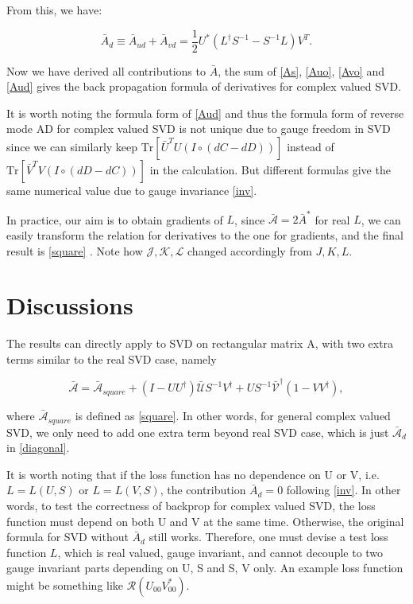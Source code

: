 \documentclass[aps,prl,singlecolumn,preprintnumbers,amsmath,amssymb,notitlepage]{revtex4-1}
\def\Tr{\mathrm{Tr}}
\newcommand{\<}{\langle}
\renewcommand{\>}{\rangle}
\newcommand{\eq}[2]{
	\begin{equation}
	#1 \label{#2}
	\end{equation}
}
\begin{document}
From this, we have:
\eq{\bar{A}_d\equiv \bar{A}_{ud}+\bar{A}_{vd}=\frac{1}{2} U^*  (L^\dagger S^{-1} -S^{-1}L) V^T.}{Aud} 

Now we have derived all contributions to $\bar{A}$, the sum of \eqref{As}, \eqref{Auo}, \eqref{Avo} and \eqref{Aud} gives the back propagation formula of derivatives for complex valued SVD. 

It is worth noting the formula form of \eqref{Aud} and thus the formula form of reverse mode AD for complex valued SVD is not unique due to gauge freedom in SVD since we can similarly keep $\Tr[\bar{U}^TU(I\circ (dC-dD))]$ instead of $\Tr[\bar{V}^TV(I\circ (dD-dC))]$ in the calculation. But different formulas give the same numerical value due to gauge invariance \eqref{inv}.

In practice, our aim is to obtain gradients of $L$, since $\bar{\mathcal{A}}=2\bar{A}^*$ for real $L$, we can easily transform the relation for derivatives to the one for gradients, and the final result is \eqref{square} \cite{Wan2019}. Note how $\mathcal{J}, \mathcal{K}, \mathcal{L}$ changed accordingly from $J, K, L$.


\section{Discussions}

The results can directly apply to SVD on rectangular matrix A, with two extra terms similar to the real SVD case, namely

\eq{\bar{\mathcal{A}}=\bar{\mathcal{A}}_{square}+(I-UU^\dagger)\bar{\mathcal {U}}S^{-1}V^\dagger +US^{-1}\bar{\mathcal {V}}^\dagger (1-VV^\dagger), }{rec}
where $\bar{ \mathcal{A}}_{square}$ is defined as \eqref{square}. In other words, for general complex valued SVD, we only need to add one extra term beyond real SVD case, which is just $\bar{\mathcal{A}}_d$ in \eqref{diagonal}.

It is worth noting that if the loss function has no dependence on U or V, i.e. $L=L(U,S)$ or $L=L(V,S)$, the contribution $\bar{A}_{d}=0$ following \eqref{inv}. In other words, to test the correctness of backprop for complex valued SVD, the loss function must depend on both U and V at the same time. Otherwise, the original formula for SVD without $\bar{A}_{d}$ still works. Therefore, one must devise a test loss function $L$, which is real valued, gauge invariant, and cannot decouple to two gauge invariant parts depending on U, S and S, V only. An example loss function might be something like $\mathcal{R}(U_{00}V_{00}^*)$.
\end{document}
